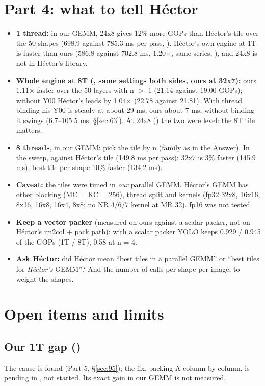 \section{Part 4: what to tell H\'ector}
\begin{itemize}\setlength\itemsep{2pt}
\item \textbf{1 thread:} in our GEMM, 24x8 gives 12\% more GOPs than H\'ector's tile over the 50 shapes (698.9 against 785.3 ms per pass, ). H\'ector's own engine at 1T is faster than ours (586.8 against 702.8 ms, 1.20$\times$, same series, ), and 24x8 is not in H\'ector's library.
\item \textbf{Whole engine at 8T (, same settings both sides, ours at 32x7):} ours 1.11$\times$ faster over the 50 layers with n $>$ 1 (21.14 against 19.00 GOPs); without Y00 H\'ector's leads by 1.04$\times$ (22.78 against 21.81). With thread binding his Y00 is steady at about 29 ms, ours about 7 ms; without binding it swings (6.7--105.5 ms, \S\ref{sec:63}). At 24x8 () the two were level: the 8T tile matters.
\item \textbf{8 threads}, in our GEMM: pick the tile by n (family as in the Answer). In the  sweep, against H\'ector's tile (149.8 ms per pass): 32x7 is 3\% faster (145.9 ms), best tile per shape 10\% faster (134.2 ms).
\item \textbf{Caveat:} the tiles were timed in \emph{our} parallel GEMM. H\'ector's GEMM has other blocking (MC = KC = 256), thread split and kernels (fp32 32x8, 16x16, 8x16, 16x8, 16x4, 8x8; no NR 4/6/7 kernel at MR 32). fp16 was not tested.
\item \textbf{Keep a vector packer} (measured on ours against a scalar packer, not on H\'ector's im2col + pack path): with a scalar packer YOLO keeps 0.929 / 0.945 of the GOPs (1T / 8T), 0.58 at n = 4.
\item \textbf{Ask H\'ector:} did H\'ector mean ``best tiles in a parallel GEMM'' or ``best tiles for \emph{H\'ector's} GEMM''? And the number of calls per shape per image, to weight the shapes.
\end{itemize}



\section{Open items and limits}\label{sec:open}
\subsection*{Our 1T gap ()}
The cause is found (Part 5, \S\ref{sec:95}); the fix, packing A column by column, is pending in , not started. Its exact gain in our GEMM is not measured.

